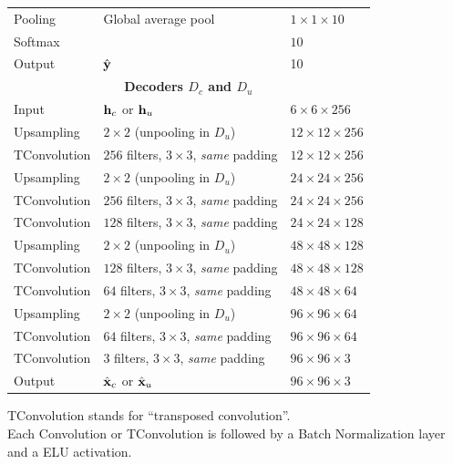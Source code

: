 \begin{table}[htbp]
\begin{threeparttable}
\begin{tabular}{ l l l}
Pooling & Global average pool & $1\times1\times10$ \\
Softmax &   & $10$ \\
Output & $\hat{\mathbf{y}}$ & 10 \\
\toprule
\multicolumn{3}{c}{\textbf{Decoders $D_c$ and $D_u$}}\\
\midrule
Input & $\mathbf{h}_c$ or $\mathbf{h}_u$ & $6\times 6\times 256$ \\
Upsampling   & $2\times2$ (unpooling in $D_u$)  & $12\times 12\times 256$ \\
TConvolution & $256$ filters, $3\times3$, \textit{same} padding  & $12\times 12\times 256$ \\
Upsampling   & $2\times2$ (unpooling in $D_u$)  & $24\times 24\times 256$ \\
TConvolution & $256$ filters, $3\times3$, \textit{same} padding  & $24\times 24\times 256$ \\
TConvolution & $128$ filters, $3\times3$, \textit{same} padding  & $24\times 24\times 128$ \\
Upsampling   & $2\times2$ (unpooling in $D_u$)  & $48\times 48\times 128$ \\
TConvolution & $128$ filters, $3\times3$, \textit{same} padding  & $48\times 48\times 128$ \\
TConvolution & $64$ filters, $3\times3$, \textit{same} padding  & $48\times 48\times 64$ \\
Upsampling   & $2\times2$ (unpooling in $D_u$)  & $96\times 96\times 64$ \\
TConvolution & $64$ filters, $3\times3$, \textit{same} padding  & $96\times 96\times 64$ \\
TConvolution & $3$ filters, $3\times3$, \textit{same} padding  & $96\times 96\times 3$ \\
Output & $\hat{\mathbf{x}}_c$ or $\hat{\mathbf{x}}_u$ & $96\times 96 \times 3$ \\
\bottomrule
\end{tabular}
\begin{tablenotes}
TConvolution stands for ``transposed convolution''.\\ Each Convolution or TConvolution is followed by a Batch Normalization layer and a ELU activation.
\end{tablenotes}
\end{threeparttable}
\end{table}


